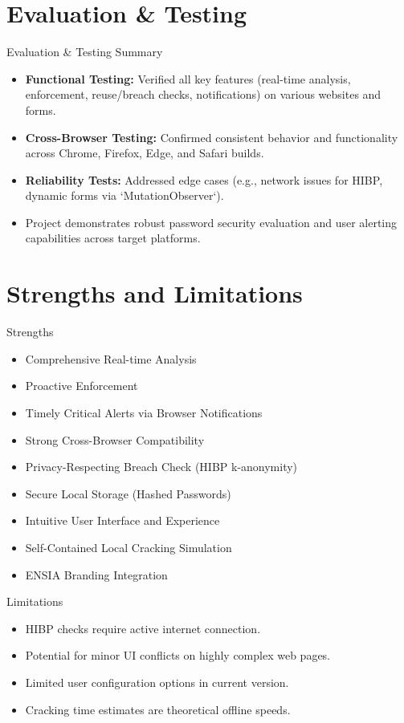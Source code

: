 \documentclass[aspectratio=169]{beamer}
\begin{document}
\section{Evaluation \& Testing}
\begin{frame}{Evaluation \& Testing Summary}
  \begin{itemize}
    \item \textbf{Functional Testing:} Verified all key features (real-time analysis, enforcement, reuse/breach checks, notifications) on various websites and forms.
    \item \textbf{Cross-Browser Testing:} Confirmed consistent behavior and functionality across Chrome, Firefox, Edge, and Safari builds.
    \item \textbf{Reliability Tests:} Addressed edge cases (e.g., network issues for HIBP, dynamic forms via `MutationObserver`).
    \item Project demonstrates robust password security evaluation and user alerting capabilities across target platforms.
  \end{itemize}
\end{frame}

\section{Strengths and Limitations}
 \begin{frame}{Strengths}
   \begin{itemize}
     \item Comprehensive Real-time Analysis
     \item Proactive Enforcement
     \item Timely Critical Alerts via Browser Notifications
     \item Strong Cross-Browser Compatibility
     \item Privacy-Respecting Breach Check (HIBP k-anonymity)
     \item Secure Local Storage (Hashed Passwords)
     \item Intuitive User Interface and Experience
     \item Self-Contained Local Cracking Simulation
     \item ENSIA Branding Integration
   \end{itemize}
 \end{frame}

 \begin{frame}{Limitations}
   \begin{itemize}
     \item HIBP checks require active internet connection.
     \item Potential for minor UI conflicts on highly complex web pages.
     \item Limited user configuration options in current version.
     \item Cracking time estimates are theoretical offline speeds.
   \end{itemize}
 \end{frame}
\end{document}
